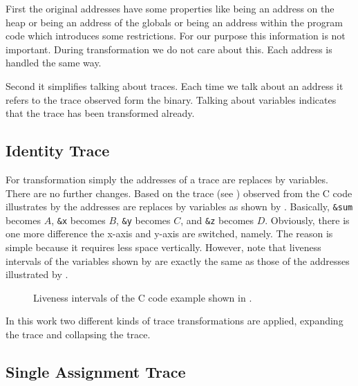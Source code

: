 \documentclass[onecolumn, openright, master, english, signatures]{dbrgrptt}
\begin{document}
First the original addresses have some properties like being an address on the heap or being an address of the globals or being an address within the program code which introduces some restrictions. For our purpose this information is not important. During transformation we do not care about this. Each address is handled the same way.

Second it simplifies talking about \ac{trace}s. Each time we talk about an address it refers to the \ac{trace} observed form the binary. Talking about variables indicates that the \ac{trace} has been transformed already.

\subsection{Identity Trace}

For transformation simply the addresses of a \ac{trace} are replaces by variables. There are no further changes. Based on the \ac{trace} (see ) observed from the C code illustrates by  the addresses are replaces by variables as shown by . Basically, \texttt{\&sum} becomes $A$, \texttt{\&x} becomes $B$, \texttt{\&y} becomes $C$, and \texttt{\&z} becomes $D$. Obviously, there is one more difference the x-axis and y-axis are switched, namely. The reason is simple because it requires less space vertically. However, note that liveness intervals of the variables shown by  are exactly the same as those of the addresses illustrated by .

\begin{figure}[!ht]
  \centering
  
  \caption{Liveness intervals of the C code example shown in .}
  \label{fig:trace-transformation-original}
\end{figure}

In this work two different kinds of \ac{trace} transformations are applied, expanding the \ac{trace} and collapsing the \ac{trace}.

\subsection{Single Assignment Trace}
\end{document}
